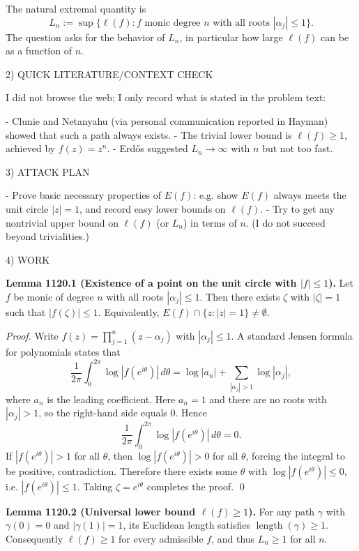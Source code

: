 The natural extremal quantity is
\[
L_n:=\sup\{\ell(f): f\text{ monic degree }n\text{ with all roots }|\alpha_j|\le 1\}.
\]
The question asks for the behavior of \(L_n\), in particular how large \(\ell(f)\) can be as a function of \(n\).

2) QUICK LITERATURE/CONTEXT CHECK

I did not browse the web; I only record what is stated in the problem text:

- Clunie and Netanyahu (via personal communication reported in Hayman) showed that such a path always exists.
- The trivial lower bound is \(\ell(f)\ge 1\), achieved by \(f(z)=z^n\).
- Erd\H{o}s suggested \(L_n\to\infty\) with \(n\) but not too fast.

3) ATTACK PLAN

- Prove basic necessary properties of \(E(f)\): e.g. show \(E(f)\) always meets the unit circle \(|z|=1\), and record easy lower bounds on \(\ell(f)\).
- Try to get any nontrivial upper bound on \(\ell(f)\) (or \(L_n\)) in terms of \(n\). (I do not succeed beyond trivialities.)

4) WORK

\textbf{Lemma 1120.1 (Existence of a point on the unit circle with \(|f|\le 1\)).}
Let \(f\) be monic of degree \(n\) with all roots \(|\alpha_j|\le 1\). Then there exists \(\zeta\) with \(|\zeta|=1\) such that \(|f(\zeta)|\le 1\). Equivalently, \(E(f)\cap\{z:|z|=1\}\ne\emptyset\).

\emph{Proof.}
Write \(f(z)=\prod_{j=1}^n (z-\alpha_j)\) with \(|\alpha_j|\le 1\).
A standard Jensen formula for polynomials states that
\[
\frac{1}{2\pi}\int_0^{2\pi} \log|f(e^{i\theta})|\,d\theta
= \log|a_n| + \sum_{|\alpha_j|>1} \log|\alpha_j|,
\]
where \(a_n\) is the leading coefficient. Here \(a_n=1\) and there are no roots with \(|\alpha_j|>1\), so the right-hand side equals \(0\). Hence
\[
\frac{1}{2\pi}\int_0^{2\pi} \log|f(e^{i\theta})|\,d\theta = 0.
\]
If \(|f(e^{i\theta})|>1\) for all \(\theta\), then \(\log|f(e^{i\theta})|>0\) for all \(\theta\), forcing the integral to be positive, contradiction. Therefore there exists some \(\theta\) with \(\log|f(e^{i\theta})|\le 0\), i.e. \(|f(e^{i\theta})|\le 1\). Taking \(\zeta=e^{i\theta}\) completes the proof. \qed

\textbf{Lemma 1120.2 (Universal lower bound \(\ell(f)\ge 1\)).}
For any path \(\gamma\) with \(\gamma(0)=0\) and \(|\gamma(1)|=1\), its Euclidean length satisfies \(\operatorname{length}(\gamma)\ge 1\). Consequently \(\ell(f)\ge 1\) for every admissible \(f\), and thus \(L_n\ge 1\) for all \(n\).

